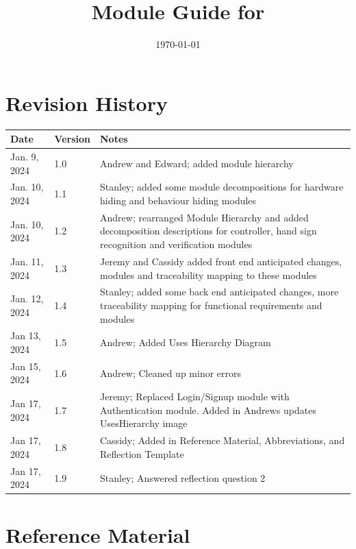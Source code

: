 \documentclass[12pt, titlepage]{article}
\begin{document}
\title{Module Guide for \progname{}} 
\author{\authname}
\date{\today}

\maketitle


\section{Revision History}

\begin{tabularx}{\textwidth}{p{3cm}p{2cm}X}
\toprule {\bf Date} & {\bf Version} & {\bf Notes}\\
\midrule
Jan. 9, 2024 & 1.0 & Andrew and Edward; added module hierarchy\\
Jan. 10, 2024 & 1.1 & Stanley; added some module decompositions for hardware hiding and behaviour hiding modules\\
Jan. 10, 2024 & 1.2 & Andrew; rearranged Module Hierarchy and added decomposition descriptions for controller, hand sign recognition and verification modules\\
Jan. 11, 2024 & 1.3 & Jeremy and Cassidy added front end anticipated changes, modules and traceability mapping to these modules\\
Jan. 12, 2024 & 1.4 & Stanley; added some back end anticipated changes, more traceability mapping for functional requirements and modules\\
Jan 13, 2024 & 1.5 & Andrew; Added Uses Hierarchy Diagram\\
Jan 15, 2024 & 1.6 & Andrew; Cleaned up minor errors\\
Jan 17, 2024 & 1.7 & Jeremy; Replaced Login/Signup module with Authentication module. Added in Andrews updates UsesHierarchy image\\
Jan 17, 2024 & 1.8 & Cassidy; Added in Reference Material, Abbreviations, and Reflection Template\\
Jan 17, 2024 & 1.9 & Stanley; Answered reflection question 2\\
\bottomrule
\end{tabularx}

\newpage

\section{Reference Material}
\end{document}
